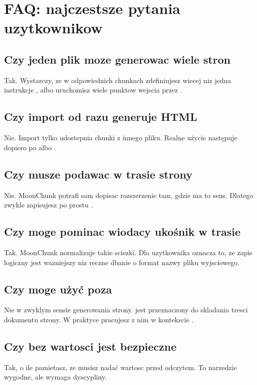 \chapter{FAQ: najczestsze pytania uzytkownikow}

\section{Czy jeden plik  moze generowac wiele stron}
Tak. Wystarczy, ze w odpowiednich chunkach zdefiniujesz wiecej niz jedna instrukcje
, albo uruchomisz wiele punktow wejscia przez .

\section{Czy import od razu generuje HTML}
Nie. Import tylko udostepnia chunki z innego pliku. Realne użycie następuje dopiero po
 albo .

\section{Czy musze podawac  w trasie strony}
Nie. MoonChunk potrafi sam dopisac rozszerzenie  tam, gdzie ma to sens.
Dlatego zwykle zapisujesz po prostu .

\section{Czy moge pominac wiodacy ukośnik w trasie}
Tak. MoonChunk normalizuje takie sciezki. Dla uzytkownika oznacza to, ze zapis logiczny
jest wazniejszy niz reczne dbanie o format nazwy pliku wyjsciowego.

\section{Czy moge użyć  poza }
Nie w zwyklym sensie generowania strony.  jest przeznaczony do skladania
tresci dokumentu strony. W praktyce pracujesz z nim w kontekscie .

\section{Czy  bez wartosci jest bezpieczne}
Tak, o ile pamietasz, ze musisz nadać wartosc przed odczytem. To narzedzie wygodne,
ale wymaga dyscypliny.

